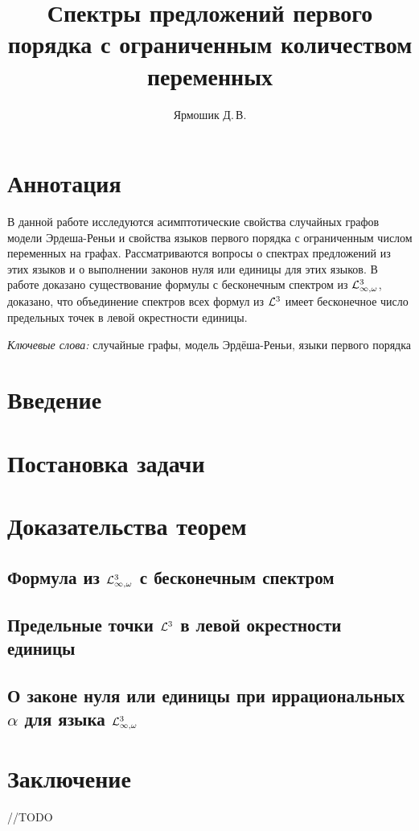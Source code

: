 \documentclass{mipt-thesis-bs}
\title{Спектры предложений первого порядка с ограниченным количеством переменных}
\author{Ярмошик Д.\,В.}
\begin{document}
\frontmatter
\titlecontents

\mainmatter

\chapter{Аннотация}
В данной работе исследуются асимптотические свойства случайных графов модели Эрдеша-Реньи и свойства языков первого порядка с ограниченным числом переменных на графах. Рассматриваются вопросы о спектрах предложений из этих языков и о выполнении законов нуля или единицы для этих языков. В работе доказано существование формулы с бесконечным спектром из $\mathcal{L}^3_{\infty, \omega}$, доказано, что объединение спектров всех формул из $\mathcal{L}^3$ имеет бесконечное число предельных точек в левой окрестности единицы.

\textit{Ключевые слова:} случайные графы, модель Эрдёша-Реньи, языки первого порядка

\chapter{Введение}


\chapter{Постановка задачи}


\chapter{Доказательства теорем}
\section{Формула из $\mathcal{L}^3_{\infty, \omega}$ с бесконечным спектром}


\section{Предельные точки $\mathcal{L}^3$ в левой окрестности единицы}


\section{О законе нуля или единицы при иррациональных $\alpha$ для языка $\mathcal{L}^3_{\infty, \omega}$}


\chapter{Заключение}
//TODO

\backmatter


\end{document}
